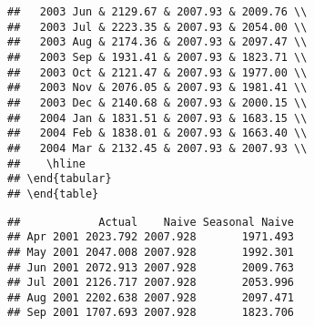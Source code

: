 \documentclass[]{article}
\begin{document}
\begin{verbatim}
##   2003 Jun & 2129.67 & 2007.93 & 2009.76 \\ 
##   2003 Jul & 2223.35 & 2007.93 & 2054.00 \\ 
##   2003 Aug & 2174.36 & 2007.93 & 2097.47 \\ 
##   2003 Sep & 1931.41 & 2007.93 & 1823.71 \\ 
##   2003 Oct & 2121.47 & 2007.93 & 1977.00 \\ 
##   2003 Nov & 2076.05 & 2007.93 & 1981.41 \\ 
##   2003 Dec & 2140.68 & 2007.93 & 2000.15 \\ 
##   2004 Jan & 1831.51 & 2007.93 & 1683.15 \\ 
##   2004 Feb & 1838.01 & 2007.93 & 1663.40 \\ 
##   2004 Mar & 2132.45 & 2007.93 & 2007.93 \\ 
##    \hline
## \end{tabular}
## \end{table}
\end{verbatim}

\begin{verbatim}
##            Actual    Naive Seasonal Naive
## Apr 2001 2023.792 2007.928       1971.493
## May 2001 2047.008 2007.928       1992.301
## Jun 2001 2072.913 2007.928       2009.763
## Jul 2001 2126.717 2007.928       2053.996
## Aug 2001 2202.638 2007.928       2097.471
## Sep 2001 1707.693 2007.928       1823.706
\end{verbatim}
\end{document}
